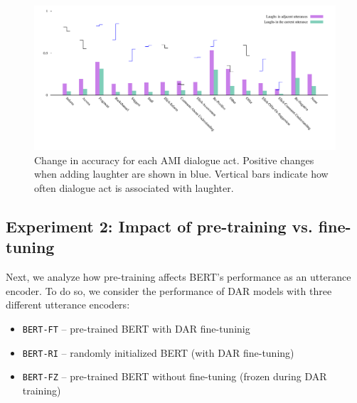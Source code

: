 \documentclass[11pt,a4paper]{article}
\begin{document}
\begin{figure}
  \centering
  \includegraphics[width=\textwidth]{img/AMI-DA-bertLvsNL.pdf}
  \caption{Change in accuracy for each AMI dialogue act. Positive changes when adding laughter are shown in blue. Vertical bars indicate how often dialogue act is associated with laughter.}
    \label{fig:ami-by-da}
  \end{figure}

  

%

\subsection{Experiment 2: Impact of pre-training vs. fine-tuning} \label{sec:experiment2} %
Next, we analyze how pre-training affects BERT's performance as an utterance encoder.
To do so, we consider the performance of DAR models with three different utterance encoders:
\begin{itemize}
  \item \texttt{BERT-FT} -- pre-trained BERT with DAR fine-tuninig 
  \item \texttt{BERT-RI} -- randomly initialized BERT (with DAR fine-tuning)
  \item \texttt{BERT-FZ} -- pre-trained BERT without fine-tuning (frozen during DAR training)
\end{itemize}
\end{document}
